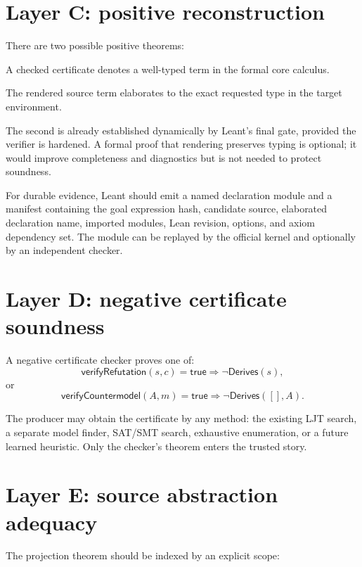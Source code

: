 \documentclass[11pt,letterpaper,openany]{report}
\theoremstyle{definition}
\theoremstyle{remark}
\begin{document}
\section{Layer C: positive reconstruction}

There are two possible positive theorems:

\begin{description}[style=nextline]
\item[Core positive theorem]
A checked certificate denotes a well-typed term in the formal core calculus.
\item[Source positive theorem]
The rendered source term elaborates to the exact requested type in the target environment.
\end{description}

The second is already established dynamically by Leant's final gate, provided the verifier is hardened. A formal proof that rendering preserves typing is optional; it would improve completeness and diagnostics but is not needed to protect soundness.

For durable evidence, Leant should emit a named declaration module and a manifest containing the goal expression hash, candidate source, elaborated declaration name, imported modules, Lean revision, options, and axiom dependency set. The module can be replayed by the official kernel and optionally by an independent checker.

\section{Layer D: negative certificate soundness}

A negative certificate checker proves one of:
\[
  \mathsf{verifyRefutation}(s,c)=\mathsf{true}
  \Longrightarrow \neg\mathsf{Derives}(s),
\]
or
\[
  \mathsf{verifyCountermodel}(A,m)=\mathsf{true}
  \Longrightarrow \neg\mathsf{Derives}([],A).
\]

The producer may obtain the certificate by any method: the existing LJT search, a separate model finder, SAT/SMT search, exhaustive enumeration, or a future learned heuristic. Only the checker's theorem enters the trusted story.

\section{Layer E: source abstraction adequacy}

The projection theorem should be indexed by an explicit scope:
\end{document}
